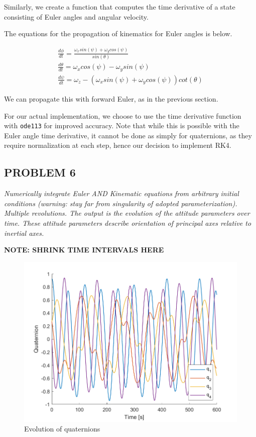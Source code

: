 Similarly, we create a function that computes the time derivative of a state consisting of Euler angles and angular velocity.

The equations for the propagation of kinematics for Euler angles is below.

\begin{align*}
\frac{d \phi}{dt} = \frac{\omega_{x} sin(\psi) + \omega_{y} cos(\psi)}{sin(\theta)}\\
\frac{d \theta}{dt} = \omega_{x} cos(\psi) - \omega_{y} sin(\psi)\\
\frac{d \psi}{dt} = \omega_{z} - (\omega_{x} sin(\psi) + \omega_{y} cos(\psi)) cot(\theta)
\end{align*}



We can propagate this with forward Euler, as in the previous section.



For our actual implementation, we choose to use the time derivative function with \texttt{ode113} for improved accuracy. Note that while this is possible with the Euler angle time derivative, it cannot be done as simply for quaternions, as they require normalization at each step, hence our decision to implement RK4.


\subsection{PROBLEM 6}
\textit{Numerically integrate Euler AND Kinematic equations from arbitrary initial conditions (warning: stay far from singularity of adopted parameterization). Multiple revolutions. The output is the evolution of the attitude parameters over time. These attitude parameters describe orientation of principal axes relative to inertial axes.}

\textbf{NOTE: SHRINK TIME INTERVALS HERE}

\begin{figure}[H]
\centering
\includegraphics[scale=0.6]{Images/ps3_problem6_quaternions.png}
\caption{Evolution of quaternions}
\label{fig:ps3_problem6_quaternions}
\end{figure}

